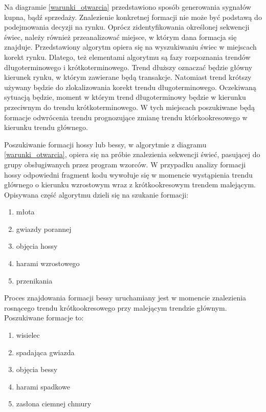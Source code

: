 \documentclass[pdflatex,11pt]{aghdpl}
\begin{document}
Na diagramie \ref{warunki_otwarcia} przedstawiono sposób generowania sygnałów kupna, bądź sprzedaży. Znalezienie konkretnej formacji nie może być podstawą do podejmowania decyzji na rynku. Oprócz zidentyfikowania określonej sekwencji świec, należy również przeanalizować miejsce, w którym dana formacja się znajduje. Przedstawiony algorytm opiera się na wyszukiwaniu świec w miejscach korekt rynku. Dlatego, też elementami algorytmu są fazy rozpoznania trendów długoterminowego i krótkoterminowego. Trend dłuższy oznaczać będzie główny kierunek rynku, w którym zawierane będą transakcje. Natomiast trend krótszy używany będzie do zlokalizowania korekt trendu długoterminowego. Oczekiwaną sytuacją będzie, moment w którym trend długoterminowy będzie w kierunku przeciwnym do trendu krótkoterminowego. W tych miejscach poszukiwane będą formacje odwrócenia trendu prognozujące zmianę trendu którkookresowego w kierunku trendu głównego. 


Poszukiwanie formacji hossy lub bessy, w algorytmie z diagramu \ref{warunki_otwarcia}, opiera się na próbie znalezienia sekwencji świeć, pasującej do grupy obsługiwanych przez program wzorców. W przypadku analizy formacji hossy odpowiedni fragment kodu wywołuje się w momencie wystąpienia trendu głównego o kierunku wzrostowym wraz z krótkookresowym trendem malejącym. Opisywana część algorytmu dzieli się na szukanie formacji:
\begin{enumerate}
\item młota
\item gwiazdy porannej
\item objęcia hossy
\item harami wzrostowego
\item przenikania
\end{enumerate}

Proces znajdowania formacji bessy uruchamiany jest w momencie znalezienia rosnącego trendu krótkookresowego przy malejącym trendzie głównym. Poszukiwane formacje to:
\begin{enumerate}
\item wisielec
\item spadająca gwiazda
\item objęcia bessy
\item harami spadkowe
\item zasłona ciemnej chmury
\end{enumerate}
\end{document}
